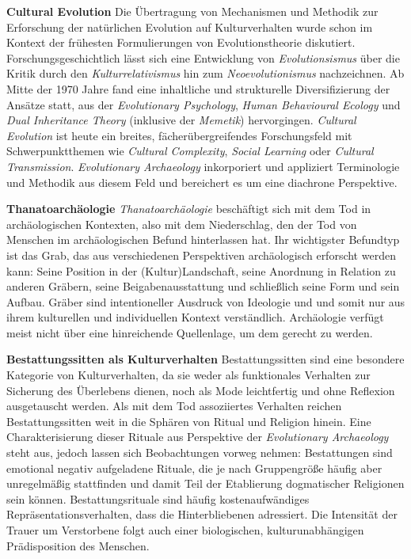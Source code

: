 \documentclass[openany,twoside,twocolumn]{book}
\begin{document}
\textbf{Cultural Evolution} \newline 
Die Übertragung von Mechanismen und Methodik zur Erforschung der natürlichen Evolution auf Kulturverhalten wurde schon im Kontext der frühesten Formulierungen von Evolutionstheorie diskutiert. Forschungsgeschichtlich lässt sich eine Entwicklung von \emph{Evolutionsismus} über die Kritik durch den \emph{Kulturrelativismus} hin zum \emph{Neoevolutionismus} nachzeichnen. Ab Mitte der 1970 Jahre fand eine inhaltliche und strukturelle Diversifizierung der Ansätze statt, aus der \emph{Evolutionary Psychology}, \emph{Human Behavioural Ecology} und \emph{Dual Inheritance Theory} (inklusive der \emph{Memetik}) hervorgingen. \emph{Cultural Evolution} ist heute ein breites, fächerübergreifendes Forschungsfeld mit Schwerpunktthemen wie \emph{Cultural Complexity}, \emph{Social Learning} oder \emph{Cultural Transmission}. \emph{Evolutionary Archaeology} inkorporiert und appliziert Terminologie und Methodik aus diesem Feld und bereichert es um eine diachrone Perspektive.

\textbf{Thanatoarchäologie} \newline 
\emph{Thanatoarchäologie} beschäftigt sich mit dem Tod in archäologischen Kontexten, also mit dem Niederschlag, den der Tod von Menschen im archäologischen Befund hinterlassen hat. Ihr wichtigster Befundtyp ist das Grab, das aus verschiedenen Perspektiven archäologisch erforscht werden kann: Seine Position in der (Kultur)Landschaft, seine Anordnung in Relation zu anderen Gräbern, seine Beigabenausstattung und schließlich seine Form und sein Aufbau. Gräber sind intentioneller Ausdruck von Ideologie und und somit nur aus ihrem kulturellen und individuellen Kontext verständlich. Archäologie verfügt meist nicht über eine hinreichende Quellenlage, um dem gerecht zu werden.

\textbf{Bestattungssitten als Kulturverhalten} \newline 
Bestattungssitten sind eine besondere Kategorie von Kulturverhalten, da sie weder als funktionales Verhalten zur Sicherung des Überlebens dienen, noch als Mode leichtfertig und ohne Reflexion ausgetauscht werden. Als mit dem Tod assoziiertes Verhalten reichen Bestattungssitten weit in die Sphären von Ritual und Religion hinein. Eine Charakterisierung dieser Rituale aus Perspektive der \emph{Evolutionary Archaeology} steht aus, jedoch lassen sich Beobachtungen vorweg nehmen: Bestattungen sind emotional negativ aufgeladene Rituale, die je nach Gruppengröße häufig aber unregelmäßig stattfinden und damit Teil der Etablierung dogmatischer Religionen sein können. Bestattungsrituale sind häufig kostenaufwändiges Repräsentationsverhalten, dass die Hinterbliebenen adressiert. Die Intensität der Trauer um Verstorbene folgt auch einer biologischen, kulturunabhängigen Prädisposition des Menschen.
\end{document}
